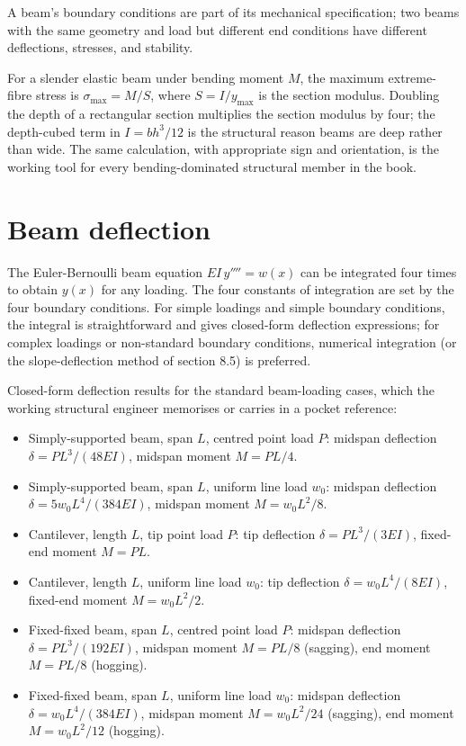 A beam's boundary conditions are part of its mechanical specification;
two beams with the same geometry and load but different end conditions
have different deflections, stresses, and stability.

\begin{principle}
For a slender elastic beam under bending moment $M$, the maximum
extreme-fibre stress is $\sigma_{\max} = M/S$, where $S = I/y_{\max}$
is the section modulus. Doubling the depth of a rectangular section
multiplies the section modulus by four; the depth-cubed term in
$I = bh^3/12$ is the structural reason beams are deep rather than wide.
The same calculation, with appropriate sign and orientation, is the
working tool for every bending-dominated structural member in the
book.
\end{principle}

\section{Beam deflection}

The Euler-Bernoulli beam equation $EI \,y'''' = w(x)$ can be
integrated four times to obtain $y(x)$ for any loading. The four
constants of integration are set by the four boundary conditions.
For simple loadings and simple boundary conditions, the integral is
straightforward and gives closed-form deflection expressions; for
complex loadings or non-standard boundary conditions, numerical
integration (or the slope-deflection method of section 8.5) is
preferred.

Closed-form deflection results for the standard beam-loading cases,
which the working structural engineer memorises or carries in a
pocket reference:

\begin{itemize}[leftmargin=*]
  \item Simply-supported beam, span $L$, centred point load $P$:
    midspan deflection $\delta = PL^3/(48 EI)$, midspan moment $M =
    PL/4$.
  \item Simply-supported beam, span $L$, uniform line load $w_0$:
    midspan deflection $\delta = 5 w_0 L^4/(384 EI)$, midspan moment
    $M = w_0 L^2/8$.
  \item Cantilever, length $L$, tip point load $P$: tip deflection
    $\delta = PL^3/(3 EI)$, fixed-end moment $M = PL$.
  \item Cantilever, length $L$, uniform line load $w_0$: tip
    deflection $\delta = w_0 L^4/(8 EI)$, fixed-end moment $M = w_0
    L^2/2$.
  \item Fixed-fixed beam, span $L$, centred point load $P$: midspan
    deflection $\delta = PL^3/(192 EI)$, midspan moment $M = PL/8$
    (sagging), end moment $M = PL/8$ (hogging).
  \item Fixed-fixed beam, span $L$, uniform line load $w_0$: midspan
    deflection $\delta = w_0 L^4/(384 EI)$, midspan moment $M =
    w_0 L^2/24$ (sagging), end moment $M = w_0 L^2/12$ (hogging).
\end{itemize}

